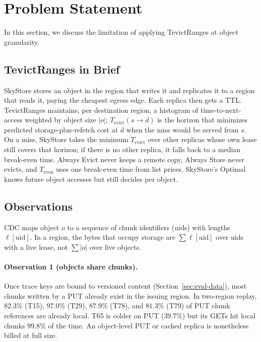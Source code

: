 \section{Problem Statement}
\label{sec:problem}

In this section, we discuss the limitation of applying TevictRanges at object granularity.

\subsection{TevictRanges in Brief}

SkyStore stores an object in the region that writes it and replicates it to a region that reads it, paying the cheapest egress edge.
Each replica then gets a {TTL}.
TevictRanges maintains, per destination region, a histogram of time-to-next-access weighted by object size $|o|$; $T_{\mathrm{evict}}(s\!\to\!d)$ is the horizon that minimizes predicted storage-plus-refetch cost at $d$ when the miss would be served from $s$.
On a miss, SkyStore takes the minimum $T_{\mathrm{evict}}$ over other replicas whose own lease still covers that horizon; if there is no other replica, it falls back to a median break-even time.
Always Evict never keeps a remote copy, Always Store never evicts, and $T_{\mathrm{even}}$ uses one break-even time from list prices.
SkyStore's Optimal knows future object accesses but still decides per object.

\subsection{Observations}

{CDC} maps object $o$ to a sequence of chunk identifiers ({uid}s) with lengths $\ell[\mathrm{uid}]$.
In a region, the bytes that occupy storage are $\sum \ell[\mathrm{uid}]$ over uids with a live lease, not $\sum |o|$ over live objects.

\paragraph{Observation 1 (objects share chunks).}
Once trace keys are bound to versioned content (Section~\ref{sec:eval-data}), most chunks written by a {PUT} already exist in the issuing region.
In two-region replay, $82.3\%$ ({T}15), $97.0\%$ ({T}29), $87.9\%$ ({T}78), and $81.3\%$ ({T}79) of {PUT} chunk references are already local.
{T}65 is colder on {PUT} ($39.7\%$) but its {GET}s hit local chunks $99.8\%$ of the time.
An object-level {PUT} or cached replica is nonetheless billed at full size.

